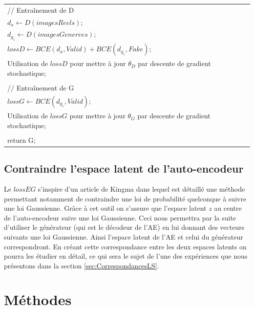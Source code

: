 \documentclass[11pt,francais]{article}
\begin{document}
\begin{table}[t!]
\begin{tabular}{l}
  \hspace{1cm}// Entraînement de D\tabularnewline
  \hspace{1cm}\(d_x \leftarrow D(imagesReels)\);\tabularnewline
  \hspace{1cm}\(d_{g_z} \leftarrow D(imagesGenerees)\);\tabularnewline
  \hspace{1cm}\(lossD \leftarrow BCE(d_x,Valid) + BCE(d_{g_z},Fake)\);\tabularnewline
  \hspace{1cm}Utilisation de \(lossD\) pour mettre à jour \(\theta_D\) par descente de gradient stochastique;\tabularnewline
  \tabularnewline
  
  \hspace{1cm}// Entraînement de G\tabularnewline
  \hspace{1cm}\(lossG\leftarrow BCE(d_{g_z},Valid)\);\tabularnewline
  \hspace{1cm}Utilisation de \(lossG\) pour mettre à jour \(\theta_G\) par descente de gradient stochastique;\tabularnewline
  \tabularnewline
  
  return G;\tabularnewline
  \hline
  \end{tabular}
  \label{tab:tab2}
\end{table}


\subsection{Contraindre l'espace latent de l'auto-encodeur}
\label{sec:LatentSpace}
Le \(lossEG\) s'inspire d'un article de Kingma \cite{kingma2013auto} dans lequel est détaillé une méthode permettant notamment de contraindre une loi de probabilité quelconque à suivre une loi Gaussienne. Grâce à cet outil on s'assure que l'espace latent \(z\) au centre de l'auto-encodeur suive une loi Gaussienne. Ceci nous permettra par la suite d'utiliser le générateur (qui est le décodeur de l'AE) en lui donnant des vecteurs suivants une loi Gaussienne. Ainsi l'espace latent de l'AE et celui du générateur correspondront.
En créant cette correspondance entre les deux espaces latents on pourra les étudier en détail, ce qui sera le sujet de l'une des expériences que nous présentons dans la section \ref{sec:CorrespondancesLS}.

\section{Méthodes}
\end{document}
